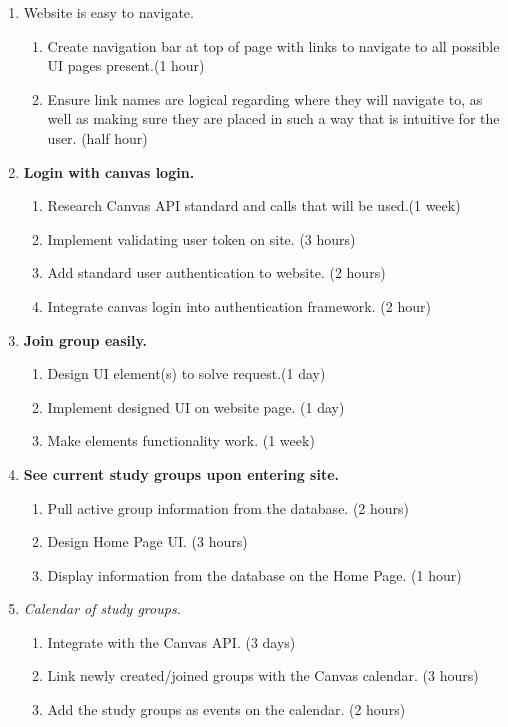 \documentclass[12pt,letterpaper]{article}
\begin{document}
\begin{enumerate}
\begin{enumerate}
	\end{enumerate}
\item Website is easy to navigate.
	\begin{enumerate}
	\item Create navigation bar at top of page with links to navigate to all possible UI pages present.(1 hour)
    \item Ensure link names are logical regarding where they will navigate to, as well as making sure they are placed in such a way that is intuitive for the user. (half hour)
	\end{enumerate}
\item \textbf{Login with canvas login.}
	\begin{enumerate}
	\item Research Canvas API standard and calls that will be used.(1 week)
    \item Implement validating user token on site. (3 hours)
    \item Add standard user authentication to website. (2 hours)
    \item Integrate canvas login into authentication framework. (2 hour)
	\end{enumerate}
\item \textbf{Join group easily.}
	\begin{enumerate}
	\item Design UI element(s) to solve request.(1 day)
    \item Implement designed UI on website page. (1 day)
    \item Make elements functionality work. (1 week)
	\end{enumerate}
\item \textbf{See current study groups upon entering site.}
	\begin{enumerate}
	\item Pull active group information from the database. (2 hours)
    \item Design Home Page UI. (3 hours)
    \item Display information from the database on the Home Page. (1 hour)
	\end{enumerate}
\item \textit{Calendar of study groups.}
	\begin{enumerate}
	\item Integrate with the Canvas API. (3 days)
    \item Link newly created/joined groups with the Canvas calendar. (3 hours)
    \item Add the study groups as events on the calendar. (2 hours)

\end{enumerate}
\end{enumerate}
\end{document}
